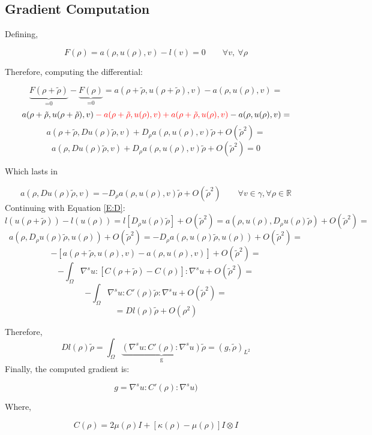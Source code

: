 \subsection{Gradient Computation}
Defining,

$$F(\rho)=a(\rho, u(\rho),v)-l(v)=0 \qquad \forall v, \: \forall \rho$$

Therefore, computing the differential:

$$\underbrace{F(\rho+\tilde{\rho})}_\text{=0}-\underbrace{F(\rho)}_\text{=0}=a(\rho+\tilde{\rho},u(\rho+\tilde{\rho}),v)-a(\rho,u(\rho),v) =$$
$$a(\rho+\tilde{\rho},u(\rho+\tilde{\rho}),v)\textcolor{red}{ \: -\: a(\rho+\tilde{\rho},u(\rho),v)}\textcolor{red}{ \: +\: a(\rho+\tilde{\rho},u(\rho),v)} - a(\rho,u(\rho),v)=$$
$$a(\rho+\tilde{\rho},Du(\rho)\tilde{\rho},v)+D_\rho a(\rho,u(\rho),v)\tilde{\rho}+O(\tilde{\rho}^2)=$$
$$a(\rho,Du(\rho)\tilde{\rho},v)+D_\rho a(\rho,u(\rho),v)\tilde{\rho}+O(\tilde{\rho}^2)=0$$

Which lasts in

\begin{equation} \label{E:a}
a(\rho,Du(\rho)\tilde{\rho},v) = \boxed{-D_\rho a(\rho,u(\rho),v) \tilde{\rho}} + O(\tilde{\rho}^2)  \qquad  \forall  v \in \gamma, \forall \rho \in \mathbb{R}
\end{equation}
Continuing with Equation \ref{E:D}:
$$l(u(\rho + \tilde{\rho}))-l(u(\rho))=l[D_\rho u(\rho) \tilde{\rho}] + O(\tilde{\rho}^2) = a(\rho,u(\rho),D_\rho u(\rho)\tilde{\rho})+ O(\tilde{\rho}^2)=$$
$$a(\rho,D_\rho u(\rho)\tilde{\rho},u(\rho))+ O(\tilde{\rho}^2) =-D_\rho a(\rho,u(\rho)\tilde{\rho},u(\rho))+ O(\tilde{\rho}^2)=$$
$$-\left[a(\rho+\tilde{\rho}, u(\rho),v)-a(\rho, u(\rho),v) \right] + O(\tilde{\rho}^2)=$$
$$-\int_{\Omega} \nabla^s u :[C(\rho+\tilde{\rho})-C(\rho)]:\nabla^s u + O(\tilde{\rho}^2)=$$
$$-\int_{\Omega} \nabla^s u : C'(\rho)\tilde{\rho}:\nabla^s u + O(\tilde{\rho}^2)=$$
$$=Dl(\rho)\tilde{\rho} + O(\rho^2)$$


Therefore,
$$Dl(\rho)\tilde{\rho} = \int_{\Omega} \underbrace{(\nabla^s u : C'(\rho):\nabla^s u)}_\text{g} \tilde{\rho}= (g,\tilde{\rho})_{L^2}$$
Finally, the computed gradient is:

\begin{equation}
\boxed{g=\nabla^s u : C'(\rho):\nabla^s u)}
\end{equation}

Where,

$$C(\rho)=2\mu(\rho)I+[\kappa(\rho)-\mu(\rho)] I\otimes I$$

\clearpage























